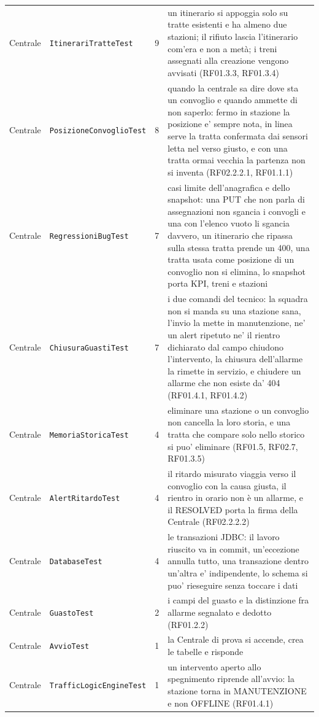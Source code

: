 \documentclass[11pt]{article}
\begin{document}
{\begin{longtable}{L{0.13\textwidth}L{0.24\textwidth}L{0.07\textwidth}L{0.42\textwidth}}
Centrale & \texttt{ItinerariTratteTest} & 9 & un itinerario si appoggia solo su tratte esistenti e ha almeno due stazioni; il rifiuto lascia l'itinerario com'era e non a metà; i treni assegnati alla creazione vengono avvisati (RF01.3.3, RF01.3.4)\\
Centrale & \texttt{PosizioneConvoglioTest} & 8 & quando la centrale sa dire dove sta un convoglio e quando ammette di non saperlo: fermo in stazione la posizione e' sempre nota, in linea serve la tratta confermata dai sensori letta nel verso giusto, e con una tratta ormai vecchia la partenza non si inventa (RF02.2.2.1, RF01.1.1)\\
Centrale & \texttt{RegressioniBugTest} & 7 & casi limite dell'anagrafica e dello snapshot: una PUT che non parla di assegnazioni non sgancia i convogli e una con l'elenco vuoto li sgancia davvero, un itinerario che ripassa sulla stessa tratta prende un 400, una tratta usata come posizione di un convoglio non si elimina, lo snapshot porta KPI, treni e stazioni\\
Centrale & \texttt{ChiusuraGuastiTest} & 7 & i due comandi del tecnico: la squadra non si manda su una stazione sana, l'invio la mette in manutenzione, ne' un alert ripetuto ne' il rientro dichiarato dal campo chiudono l'intervento, la chiusura dell'allarme la rimette in servizio, e chiudere un allarme che non esiste da' 404 (RF01.4.1, RF01.4.2)\\
Centrale & \texttt{MemoriaStoricaTest} & 4 & eliminare una stazione o un convoglio non cancella la loro storia, e una tratta che compare solo nello storico si puo' eliminare (RF01.5, RF02.7, RF01.3.5)\\
Centrale & \texttt{AlertRitardoTest} & 4 & il ritardo misurato viaggia verso il convoglio con la causa giusta, il rientro in orario non è un allarme, e il RESOLVED porta la firma della Centrale (RF02.2.2.2)\\
Centrale & \texttt{DatabaseTest} & 4 & le transazioni JDBC: il lavoro riuscito va in commit, un'eccezione annulla tutto, una transazione dentro un'altra e' indipendente, lo schema si puo' rieseguire senza toccare i dati\\
Centrale & \texttt{GuastoTest} & 2 & i campi del guasto e la distinzione fra allarme segnalato e dedotto (RF01.2.2)\\
Centrale & \texttt{AvvioTest} & 1 & la Centrale di prova si accende, crea le tabelle e risponde\\
Centrale & \texttt{TrafficLogicEngineTest} & 1 & un intervento aperto allo spegnimento riprende all'avvio: la stazione torna in MANUTENZIONE e non OFFLINE (RF01.4.1)\\

\end{longtable}}
\end{document}
